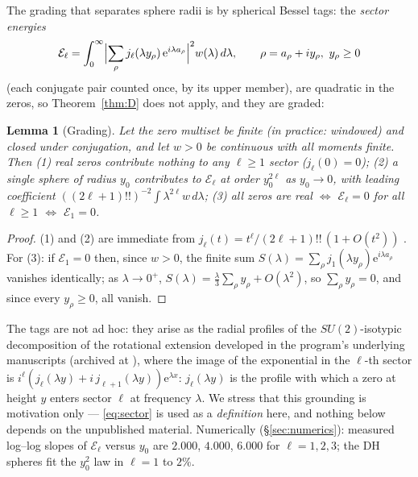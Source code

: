 \documentclass[11pt]{amsart}
\theoremstyle{plain}
\newtheorem{lemma}[theorem]{Lemma}
\theoremstyle{definition}
\theoremstyle{remark}
\newcommand{\eE}{\mathrm{e}}
\newcommand{\EE}{\mathcal{E}}
\newcommand{\dd}{\,d}
\begin{document}
The grading that separates sphere radii is by spherical Bessel tags: the \emph{sector energies}
\begin{equation}\label{eq:sector}
\EE_\ell=\int_0^\infty\Bigl|\sum_\rho j_\ell(\lambda y_\rho)\,\eE^{i\lambda a_\rho}\Bigr|^2
w(\lambda)\dd\lambda,\qquad \rho=a_\rho+iy_\rho,\ y_\rho\ge0
\end{equation}
(each conjugate pair counted once, by its upper member), are quadratic in the zeros, so
Theorem~\ref{thm:D} does not apply, and they are graded:

\begin{lemma}[Grading]\label{lem:grading}
Let the zero multiset be finite (in practice: windowed) and closed under conjugation, and let
$w>0$ be continuous with all moments finite. Then \textup{(1)} real zeros contribute nothing to
any $\ell\ge1$ sector ($j_\ell(0)=0$); \textup{(2)} a single sphere of radius $y_0$ contributes
to $\EE_\ell$ at order $y_0^{2\ell}$ as $y_0\to0$, with leading coefficient
$((2\ell+1)!!)^{-2}\int\lambda^{2\ell}w\dd\lambda$; \textup{(3)} all zeros are real $\iff$
$\EE_\ell=0$ for all $\ell\ge1$ $\iff$ $\EE_1=0$.
\end{lemma}

\begin{proof}
(1) and (2) are immediate from $j_\ell(t)=t^\ell/(2\ell+1)!!\,(1+O(t^2))$
\cite[10.52.1]{DLMF}. For (3): if $\EE_1=0$ then, since $w>0$, the finite sum
$S(\lambda)=\sum_\rho j_1(\lambda y_\rho)\eE^{i\lambda a_\rho}$ vanishes identically; as
$\lambda\to0^+$, $S(\lambda)=\tfrac\lambda3\sum_\rho y_\rho+O(\lambda^2)$, so
$\sum_\rho y_\rho=0$, and since every $y_\rho\ge0$, all vanish.
\end{proof}

The tags are not ad hoc: they arise as the radial profiles of the $SU(2)$-isotypic decomposition
of the rotational extension developed in the program's underlying manuscripts
\cite{Baker2015,Baker2016} (archived at \cite{ZenodoArchive}), where the image of the exponential
in the $\ell$-th sector is $i^\ell(j_\ell(\lambda y)+i\,j_{\ell+1}(\lambda y))\eE^{\lambda x}$:
$j_\ell(\lambda y)$ is the profile with which a zero at height $y$ enters sector $\ell$ at
frequency $\lambda$. We stress that this grounding is motivation only --- \eqref{eq:sector} is
used as a \emph{definition} here, and nothing below depends on the unpublished material.
Numerically (\S\ref{sec:numerics}): measured log--log slopes of $\EE_\ell$ versus $y_0$ are
$2.000$, $4.000$, $6.000$ for $\ell=1,2,3$; the DH spheres fit the $y_0^2$ law in $\ell=1$ to
$2\%$.
\end{document}
